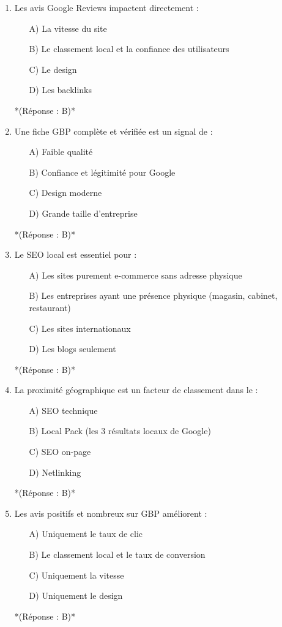 \documentclass[12pt,a4paper,twoside]{report}
\begin{document}
\begin{enumerate}
\item Les avis Google Reviews impactent directement :
\begin{itemize}
\item[A)] La vitesse du site
\item[B)] Le classement local et la confiance des utilisateurs
\item[C)] Le design
\item[D)] Les backlinks
\end{itemize}
*(Réponse : B)*

\item Une fiche GBP complète et vérifiée est un signal de :
\begin{itemize}
\item[A)] Faible qualité
\item[B)] Confiance et légitimité pour Google
\item[C)] Design moderne
\item[D)] Grande taille d'entreprise
\end{itemize}
*(Réponse : B)*

\item Le SEO local est essentiel pour :
\begin{itemize}
\item[A)] Les sites purement e-commerce sans adresse physique
\item[B)] Les entreprises ayant une présence physique (magasin, cabinet, restaurant)
\item[C)] Les sites internationaux
\item[D)] Les blogs seulement
\end{itemize}
*(Réponse : B)*

\item La proximité géographique est un facteur de classement dans le :
\begin{itemize}
\item[A)] SEO technique
\item[B)] Local Pack (les 3 résultats locaux de Google)
\item[C)] SEO on-page
\item[D)] Netlinking
\end{itemize}
*(Réponse : B)*

\item Les avis positifs et nombreux sur GBP améliorent :
\begin{itemize}
\item[A)] Uniquement le taux de clic
\item[B)] Le classement local et le taux de conversion
\item[C)] Uniquement la vitesse
\item[D)] Uniquement le design
\end{itemize}
*(Réponse : B)*


\end{enumerate}
\end{document}
